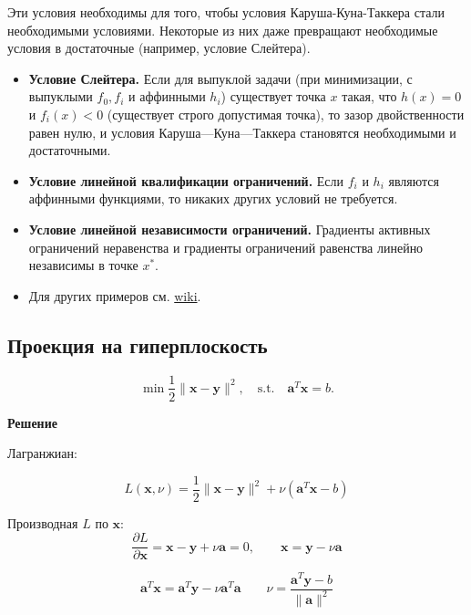\documentclass[
  russian,
  letterpaper,
  DIV=11,
  numbers=noendperiod]{scrartcl}
\providecommand{\tightlist}{%
  \setlength{\itemsep}{0pt}\setlength{\parskip}{0pt}}
\begin{document}
Эти условия необходимы для того, чтобы условия Каруша-Куна-Таккера стали
необходимыми условиями. Некоторые из них даже превращают необходимые
условия в достаточные (например, условие Слейтера).

\begin{itemize}
\tightlist
\item
  \textbf{Условие Слейтера.} Если для выпуклой задачи (при минимизации,
  с выпуклыми \(f_0, f_{i}\) и аффинными \(h_{i}\)) существует точка
  \(x\) такая, что \(h(x) = 0\) и \(f_{i}(x) < 0\) (существует строго
  допустимая точка), то зазор двойственности равен нулю, и условия
  Каруша---Куна---Таккера становятся необходимыми и достаточными.
\item
  \textbf{Условие линейной квалификации ограничений.} Если \(f_{i}\) и
  \(h_{i}\) являются аффинными функциями, то никаких других условий не
  требуется.
\item
  \textbf{Условие линейной независимости ограничений.} Градиенты
  активных ограничений неравенства и градиенты ограничений равенства
  линейно независимы в точке \(x^*\).\\
\item
  Для других примеров см.
  \href{https://en.wikipedia.org/wiki/Karush\%E2\%80\%93Kuhn\%E2\%80\%93Tucker_conditions\#Regularity_conditions_(or_constraint_qualifications)}{wiki}.
\end{itemize}

\subsection{Проекция на
гиперплоскость}\label{ux43fux440ux43eux435ux43aux446ux438ux44f-ux43dux430-ux433ux438ux43fux435ux440ux43fux43bux43eux441ux43aux43eux441ux442ux44c}

\[
\min \frac{1}{2}\|\mathbf{x} - \mathbf{y}\|^2, \quad \text{s.t.} \quad \mathbf{a}^T\mathbf{x} = b.
\]

\textbf{Решение}

Лагранжиан:

\[
L(\mathbf{x}, \nu) = \frac{1}{2}\|\mathbf{x} - \mathbf{y}\|^2 + \nu(\mathbf{a}^T\mathbf{x} - b)
\]

Производная \(L\) по \(\mathbf{x}\): \[
\frac{\partial L}{\partial \mathbf{x}} = \mathbf{x} - \mathbf{y} + \nu\mathbf{a} = 0, \qquad \mathbf{x} = \mathbf{y} - \nu\mathbf{a}
\]

\[
\mathbf{a}^T\mathbf{x} = \mathbf{a}^T\mathbf{y} - \nu\mathbf{a}^T\mathbf{a} \qquad \nu = \dfrac{\mathbf{a}^T\mathbf{y} - b}{\|\mathbf{a}\|^2}
\]
\end{document}
